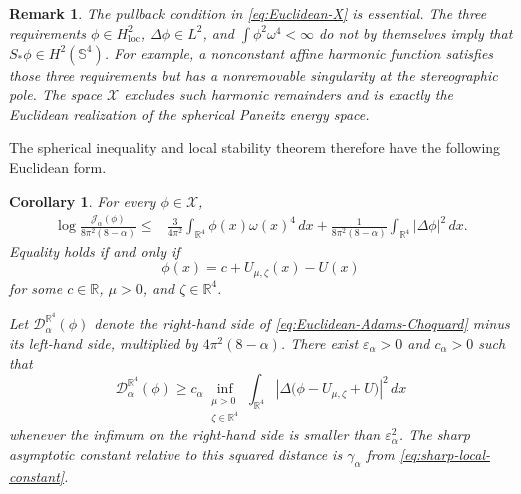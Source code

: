 \documentclass[11pt]{article}
\newtheorem{corollary}[theorem]{Corollary}
\newtheorem{remark}[theorem]{Remark}
\numberwithin{equation}{section}
\begin{document}
\begin{remark}\label{rem:Euclidean-space-necessity}
The pullback condition in \eqref{eq:Euclidean-X} is essential. The three
requirements \(\phi\in H^{2}_{\operatorname{loc}}\),
\(\Delta\phi\in L^{2}\), and
\(\int\phi^{2}\omega^{4}<\infty\) do not by themselves imply that
\(S_{*}\phi\in H^{2}(\mathbb S^{4})\). For example, a nonconstant affine
harmonic function satisfies those three requirements but has a nonremovable
singularity at the stereographic pole. The space \(\mathcal X\) excludes such
harmonic remainders and is exactly the Euclidean realization of the spherical
Paneitz energy space.
\end{remark}

The spherical inequality and local stability theorem therefore have the following Euclidean form.

\begin{corollary}\label{cor:Euclidean-stability}
For every \(\phi\in\mathcal X\),
\begin{equation}\label{eq:Euclidean-Adams-Choquard}
\begin{aligned}
\log\frac{\mathcal J_{\alpha}(\phi)}{8\pi^{2}(8-\alpha)}
\leq{}&
\frac{3}{4\pi^{2}}\int_{\mathbb R^{4}}\phi(x)\omega(x)^{4}\,dx+\frac{1}{8\pi^{2}(8-\alpha)}
\int_{\mathbb R^{4}}|\Delta\phi|^{2}\,dx.
\end{aligned}
\end{equation}
Equality holds if and only if
\begin{equation}\label{eq:Euclidean-equality}
\phi(x)=c+U_{\mu,\zeta}(x)-U(x)
\end{equation}
for some \(c\in\mathbb R\), \(\mu>0\), and \(\zeta\in\mathbb R^{4}\).

Let \(\mathcal D_{\alpha}^{\mathbb R^{4}}(\phi)\) denote the right-hand side of \eqref{eq:Euclidean-Adams-Choquard} minus its left-hand side, multiplied by \(4\pi^{2}(8-\alpha)\). There exist \(\varepsilon_{\alpha}>0\) and \(c_{\alpha}>0\) such that
\begin{equation}\label{eq:Euclidean-stability}
\mathcal D_{\alpha}^{\mathbb R^{4}}(\phi)
\geq c_{\alpha}
\inf_{\substack{\mu>0\\ \zeta\in\mathbb R^{4}}}
\int_{\mathbb R^{4}}
\left|\Delta\bigl(\phi-U_{\mu,\zeta}+U\bigr)\right|^{2}\,dx
\end{equation}
whenever the infimum on the right-hand side is smaller than \(\varepsilon_{\alpha}^{2}\). The sharp asymptotic constant relative to this squared distance is \(\gamma_{\alpha}\) from \eqref{eq:sharp-local-constant}.
\end{corollary}
\end{document}
